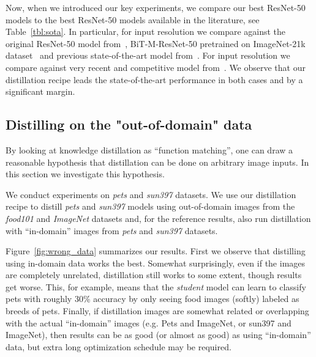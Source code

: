 \documentclass[10pt,twocolumn,letterpaper]{article}
\begin{document}
Now, when we introduced our key experiments, we compare our best ResNet-50 models to the best ResNet-50 models available in the literature, see Table~\ref{tbl:sota}. In particular, for  input resolution we compare against the original ResNet-50 model from~\cite{he2016deep}, BiT-M-ResNet-50 pretrained on ImageNet-21k dataset~\cite{russakovsky2015imagenet} and previous state-of-the-art model from~\cite{shen2020mealv2}. For  input resolution we compare against very recent and competitive model from~\cite{bello2021revisiting}. We observe that our distillation recipe leads the state-of-the-art performance in both cases and by a significant margin.

\subsection{Distilling on the "out-of-domain" data}

By looking at knowledge distillation as ``function matching'', one can draw a reasonable hypothesis that distillation can be done on arbitrary image inputs. In this section we investigate this hypothesis.

We conduct experiments on \emph{pets} and \emph{sun397} datasets. We use our distillation recipe to distill \emph{pets} and \emph{sun397} models using out-of-domain images from the \emph{food101} and \emph{ImageNet} datasets and, for the reference results, also run distillation with ``in-domain'' images from \emph{pets} and \emph{sun397} datasets.

Figure~\ref{fig:wrong_data} summarizes our results. First we observe that distilling using in-domain data works the best. Somewhat surprisingly, even if the images are completely unrelated, distillation still works to some extent, though results get worse. This, for example, means that the \emph{student} model can learn to classify pets with roughly 30\% accuracy by only seeing food images (softly) labeled as breeds of pets. 
Finally, if distillation images are somewhat related or overlapping with the actual ``in-domain'' images (e.g. Pets and ImageNet, or sun397 and ImageNet), then results can be as good (or almost as good) as using ``in-domain'' data, but extra long optimization schedule may be required. 
\end{document}
